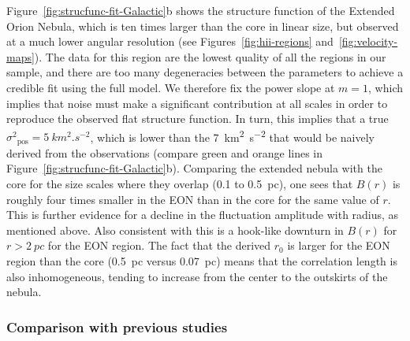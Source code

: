 \documentclass[fleqn,usenatbib, useAMS, a4paper]{mnras}
\newcommand\pos{\ensuremath{_{\mathrm{pos}}}}
\begin{document}
Figure~\ref{fig:strucfunc-fit-Galactic}b shows the structure function of the Extended Orion Nebula, which is ten times larger than the core in linear size,
but observed at a much lower angular resolution
(see Figures~\ref{fig:hii-regions} and~\ref{fig:velocity-maps}).
The data for this region are the lowest quality of all the regions in
our sample, and there are too many degeneracies between the parameters
to achieve a credible fit using the full model.
We therefore fix the power slope at \(m = 1\),
which implies that noise must make a significant contribution at all scales
in order to reproduce the observed flat structure function.
In turn, this implies that a true \(\sigma^2\pos = \SI{5}{km^2.s^{-2}}\),
which is lower than the \SI{7}{km^2.s^{-2}}
that would be naively derived from the observations
(compare green and orange lines in Figure~\ref{fig:strucfunc-fit-Galactic}b).
Comparing the extended nebula with the core for the size scales where they overlap
(\num{0.1} to \SI{0.5}{pc}), one sees that \(B(r)\) is roughly four times smaller
in the EON than in the core for the same value of \(r\).
This is further evidence for a decline in the fluctuation amplitude with radius,
as mentioned above.
Also consistent with this is a hook-like downturn in \(B(r)\) for \(r > \SI{2}{pc}\)
for the EON region.
The fact that the derived \(r_0\) is larger for the EON region than the core
(\SI{0.5}{pc} versus \SI{0.07}{pc}) means that the correlation length is also inhomogeneous,
tending to increase from the center to the outskirts of the nebula. 


\subsubsection{Comparison with previous studies}
\label{sec:comparison-orion}
\end{document}
